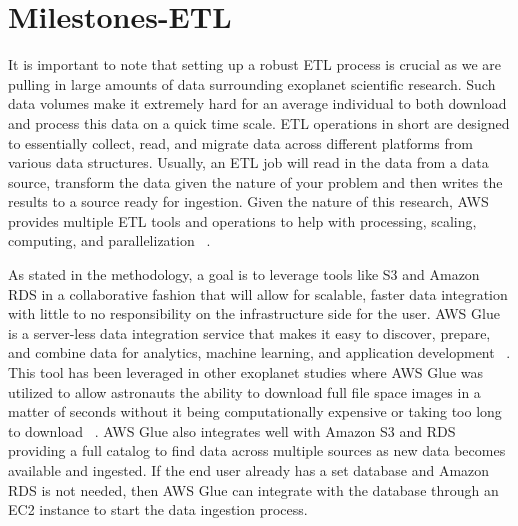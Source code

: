 \documentclass[letterpaper, 10 pt, conference]{ieeeconf}  %
\begin{document}
\section{Milestones-ETL}

It is important to note that setting up a robust ETL process is crucial as we are pulling in large amounts of data surrounding exoplanet scientific research. Such data volumes make it extremely hard for an average individual to both download and process this data on a quick time scale. ETL operations in short are designed to essentially collect, read, and migrate data across different platforms from various data structures. Usually, an ETL job will read in the data from a data source, transform the data given the nature of your problem and then writes the results to a source ready for ingestion. Given the nature of this research, AWS provides multiple ETL tools and operations to help with processing, scaling, computing, and parallelization ~\cite{AmazonGlue}.

As stated in the methodology, a goal is to leverage tools like S3 and Amazon RDS in a collaborative fashion that will allow for scalable, faster data integration with little to no responsibility on the infrastructure side for the user. AWS Glue is a server-less data integration service that makes it easy to discover, prepare, and combine data for analytics, machine learning, and application development ~\cite{AmazonGlue}. This tool has been leveraged in other exoplanet studies where AWS Glue was utilized to allow astronauts  the ability to download full file space images in a matter of seconds without it being computationally expensive or taking too long to download ~\cite{AmazonGlueUsage}. AWS Glue also integrates well with Amazon S3 and RDS providing a full catalog to find data across multiple sources as new data becomes available and ingested. If the end user already has a set database and Amazon RDS is not needed, then AWS Glue can integrate with the database through an EC2 instance to start the data ingestion process.
\end{document}

